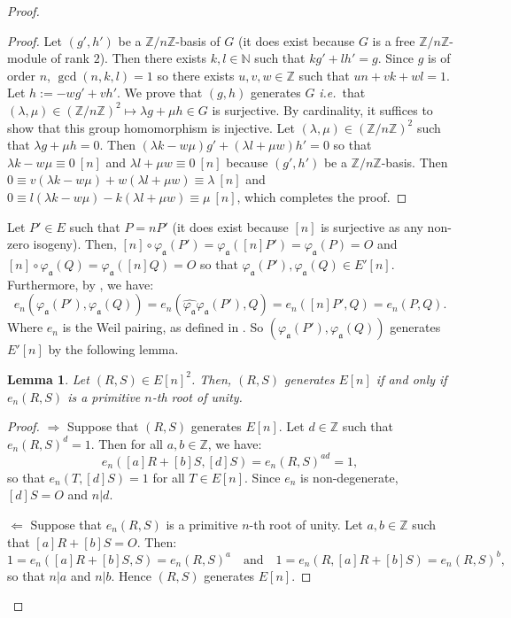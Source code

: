 \documentclass[a4paper,10pt,notitlepage]{report}
\theoremstyle{definition}
\theoremstyle{plain}
\newtheorem{Lemma}[Definition]{Lemma}
\theoremstyle{definition}
\newcommand{\ie}{\emph{i.e.}\ }
\newcommand{\N}{\mathbb{N}}
\newcommand{\Z}{\mathbb{Z}}
\renewcommand{\(}{\left(}
\renewcommand{\)}{\right)}
\newcommand{\mf}[1]{\mathfrak{#1}}
\begin{document}
\begin{proof}
\begin{proof}
Let $(g',h')$ be a $\Z/n\Z$-basis of $G$ (it does exist because $G$ is a free $\Z/n\Z$-module of rank $2$). Then there exists $k,l\in\N$ such that $kg'+lh'=g$. Since $g$ is of order $n$, $\gcd(n,k,l)=1$ so there exists $u,v,w\in\Z$ such that $un+vk+wl=1$. Let $h:=-wg'+vh'$. We prove that $(g,h)$ generates $G$ \ie that $(\lambda,\mu)\in(\Z/n\Z)^2\longmapsto \lambda g+\mu h\in G$ is surjective. By cardinality, it suffices to show that this group homomorphism is injective. Let $(\lambda,\mu)\in(\Z/n\Z)^2$ such that $\lambda g+\mu h=0$. Then $(\lambda k-w\mu)g'+(\lambda l+\mu w)h'=0$ so that $\lambda k-w\mu\equiv 0 \ [n]$ and $\lambda l+\mu w\equiv 0 \ [n]$ because $(g',h')$ be a $\Z/n\Z$-basis.  Then $0\equiv v(\lambda k-w\mu)+w(\lambda l+\mu w)\equiv \lambda \ [n]$ and $0\equiv l(\lambda k-w\mu)-k(\lambda l+\mu w)\equiv \mu \ [n]$, which completes the proof.
\end{proof}

Let $P'\in E$ such that $P=nP'$ (it does exist because $[n]$ is surjective as any non-zero isogeny). Then, $[n]\circ\varphi_{\mf{a}}(P')=\varphi_{\mf{a}}([n]P')=\varphi_{\mf{a}}(P)=O$ and $[n]\circ\varphi_{\mf{a}}(Q)=\varphi_{\mf{a}}([n]Q)=O$ so that $\varphi_{\mf{a}}(P'),\varphi_{\mf{a}}(Q)\in E'[n]$. Furthermore, by \cite[Proposition III.8.2]{Silverman1}, we have:
\[e_n(\varphi_{\mf{a}}(P'),\varphi_{\mf{a}}(Q))=e_n(\widehat{\varphi_{\mf{a}}}\varphi_{\mf{a}}(P'),Q)=e_n([n]P',Q)=e_n(P,Q).\]
Where $e_n$ is the Weil pairing, as defined in \cite[III.8]{Silverman1}. So $(\varphi_{\mf{a}}(P'),\varphi_{\mf{a}}(Q))$ generates $E'[n]$ by the following lemma.

\begin{Lemma}
Let $(R,S)\in E[n]^2$. Then, $(R,S)$ generates $E[n]$ if and only if $e_n(R,S)$ is a primitive $n$-th root of unity.
\end{Lemma}

\begin{proof}
$\Longrightarrow$ Suppose that $(R,S)$ generates $E[n]$. Let $d\in\Z$ such that $e_n(R,S)^d=1$. Then for all $a, b\in \Z$, we have:
\[e_n([a]R+[b]S,[d]S)=e_n(R,S)^{ad}=1,\]
so that $e_n(T,[d]S)=1$ for all $T\in E[n]$. Since $e_n$ is non-degenerate, $[d]S=O$ and $n|d$. 

$\Longleftarrow$ Suppose that $e_n(R,S)$ is a primitive $n$-th root of unity. Let $a, b\in \Z$ such that $[a]R+[b]S=O$. Then:
\[1=e_n([a]R+[b]S,S)=e_n(R,S)^a \quad \mbox{and} \quad 1=e_n(R,[a]R+[b]S)=e_n(R,S)^b,\]
so that $n|a$ and $n|b$. Hence $(R,S)$ generates $E[n]$.
\end{proof}


\end{proof}
\end{document}
